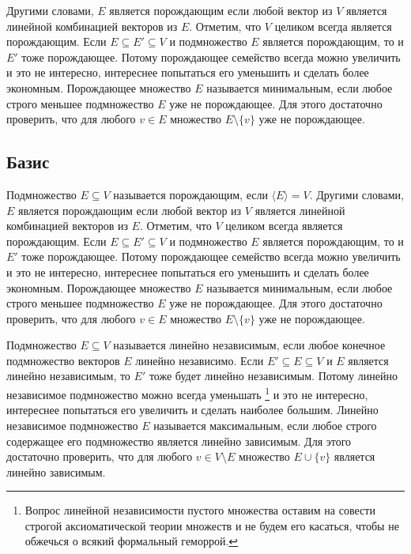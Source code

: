Другими словами, $E$ является порождающим если любой вектор из $V$ является линейной комбинацией векторов из $E$.
Отметим, что $V$ целиком всегда является порождающим.
Если $E\subseteq E'\subseteq V$ и подмножество $E$ является порождающим, то и $E'$ тоже порождающее.
Потому порождающее семейство всегда можно увеличить и это не интересно, интереснее попытаться его уменьшить и сделать более экономным.
Порождающее множество $E$ называется минимальным, если любое строго меньшее подмножество $E$ уже не порождающее.
Для этого достаточно проверить, что для любого $v\in E$ множество $E\setminus \{v\}$ уже не порождающее.


\subsection{Базис}

Подмножество $E\subseteq V$ называется порождающим, если $\langle E \rangle  = V$.
Другими словами, $E$ является порождающим если любой вектор из $V$ является линейной комбинацией векторов из $E$.
Отметим, что $V$ целиком всегда является порождающим.
Если $E\subseteq E'\subseteq V$ и подмножество $E$ является порождающим, то и $E'$ тоже порождающее.
Потому порождающее семейство всегда можно увеличить и это не интересно, интереснее попытаться его уменьшить и сделать более экономным.
Порождающее множество $E$ называется минимальным, если любое строго меньшее подмножество $E$ уже не порождающее.
Для этого достаточно проверить, что для любого $v\in E$ множество $E\setminus \{v\}$ уже не порождающее.

Подмножество $E\subseteq V$ называется линейно независимым, если любое конечное подмножество векторов $E$ линейно независимо.
Если $E'\subseteq E\subseteq V$ и $E$ является линейно независимым, то $E'$ тоже будет линейно независимым.
Потому линейно независимое подмножество можно всегда уменьшать%
\footnote{Вопрос линейной независимости пустого множества оставим на совести строгой аксиоматической теории множеств и не будем его касаться, чтобы не обжечься о всякий формальный геморрой.}
и это не интересно, интереснее попытаться его увеличить и сделать наиболее большим.
Линейно независимое подмножество $E$ называется максимальным, если любое строго содержащее его подмножество является линейно зависимым.
Для этого достаточно проверить, что для любого $v\in V\setminus E$ множество $E\cup \{v\}$ является линейно зависимым.

